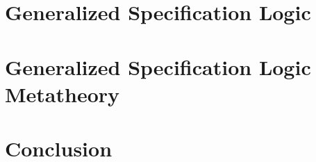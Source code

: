 \documentclass[12pt]{UOthesis}
\theoremstyle{remarkstyle}
\begin{document}


\cleardoublepage


\chapter{Generalized Specification Logic}
\label{ch:gsl}




\cleardoublepage


\chapter{Generalized Specification Logic Metatheory}
\label{ch:gslind}








\cleardoublepage


\chapter{Conclusion}
\label{ch:concl}



\cleardoublepage



\vspace*{\fill}


\vspace*{\fill}

\cleardoublepage
\end{document}
